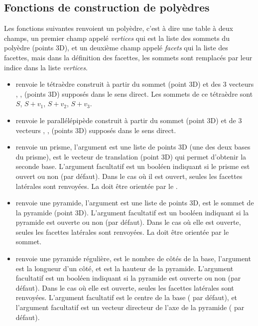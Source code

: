 \subsection{Fonctions de construction de polyèdres}

Les fonctions suivantes renvoient un polyèdre, c'est à dire une table à deux champs, un premier champ appelé \emph{vertices} qui est la liste des sommets du polyèdre (points 3D), et un deuxième champ appelé \emph{facets} qui la liste des facettes, mais dans la définition des facettes, les sommets sont remplacés par leur indice dans la liste \emph{vertices}.

\begin{itemize}
    \item {} renvoie le tétraèdre  construit à partir du sommet  (point 3D) et des 3 vecteurs , ,  (points 3D) supposés dans le sens direct. Les sommets de ce tétraèdre sont $S$, $S+v_1$, $S+v_2$, $S+v_3$.
    
    \item {} renvoie le parallélépipède construit à partir du sommet  (point 3D) et de 3 vecteurs , ,  (points 3D) supposés dans le sens direct.
    
    \item {} renvoie un prisme, l'argument  est une liste de points 3D (une des deux bases du prisme),  est le vecteur de translation (point 3D) qui permet d'obtenir la seconde base. L'argument facultatif  est un booléen indiquant si le prisme est ouvert ou non (\false par défaut). Dans le cas où il est ouvert, seules les facettes latérales sont renvoyées. La  doit être orientée par le .
    
    \item {} renvoie une pyramide, l'argument  est une liste de points 3D,  est le sommet de la pyramide (point 3D). L'argument facultatif  est un booléen indiquant si la pyramide est ouverte ou non (\false par défaut). Dans le cas où elle est ouverte, seules les facettes latérales sont renvoyées. La  doit être orientée par le sommet.
    
    \item {} renvoie une pyramide régulière,  est le nombre de côtés de la base, l'argument  est la longueur d'un côté, et  est la hauteur de la pyramide. L'argument facultatif  est un booléen indiquant si la pyramide est ouverte ou non (\false par défaut). Dans le cas où elle est ouverte, seules les facettes latérales sont renvoyées. L'argument facultatif  est le centre de la base ( par défaut), et l'argument facultatif  est un vecteur directeur de l'axe de la pyramide ( par défaut).
    

\end{itemize}
